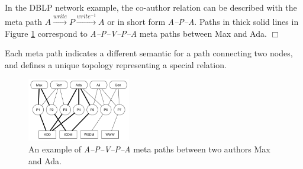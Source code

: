 \begin{example}
In the DBLP network example, the co-author relation can be described with the meta path $A\xrightarrow{write}P\xrightarrow{write^{-1}}A$ or in short form \textit{A--P--A}. Paths in thick solid lines in Figure \ref{sampleNetwork} correspond to \textit{A--P--V--P--A} meta paths between Max and Ada. $\Box$

\end{example}

Each meta path indicates a different semantic for a path connecting two nodes, and defines a unique topology representing a special relation.

\begin{figure}[t]
  \centering
      \includegraphics[width=0.4\textwidth]{figs/exampleSocialNetwork.pdf}
  \caption{An example of \textit{A--P--V--P--A} meta paths between two authors Max and Ada.}\label{sampleNetwork}
\end{figure}





